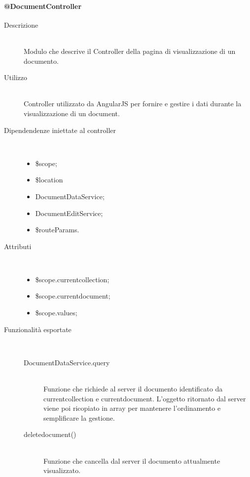 \paragraph{@DocumentController}
\begin{description}
 \item[Descrizione] \hfill \\
 Modulo che descrive il Controller della pagina di visualizzazione di un documento.
 
 \item[Utilizzo] \hfill \\
 Controller utilizzato da AngularJS per fornire e gestire i dati durante la visualizzazione di un document.
 
 \item[Dipendendenze iniettate al controller] \hfill \\
 \begin{itemize}
  \item \$scope;
  \item \$location
  \item DocumentDataService;
  \item DocumentEditService;
  \item \$routeParams.
  
 \end{itemize}
 
 \item[Attributi] \hfill \\
 \begin{itemize}
 \item  \$scope.current\textunderscore collection;
 \item  \$scope.current\textunderscore document;
 \item  \$scope.values;
 \end{itemize}
 
 \item[Funzionalità esportate] \hfill \\
 \begin{description}
  \item[DocumentDataService.query] \hfill \\
  Funzione che richiede al server il documento identificato da current\textunderscore collection e current\textunderscore document.
  L'oggetto ritornato dal server viene poi ricopiato in array per mantenere l'ordinamento e semplificare la gestione.
  \item[delete\textunderscore document()] \hfill \\
  Funzione che cancella dal server il documento attualmente visualizzato.
 \end{description}
\end{description}

